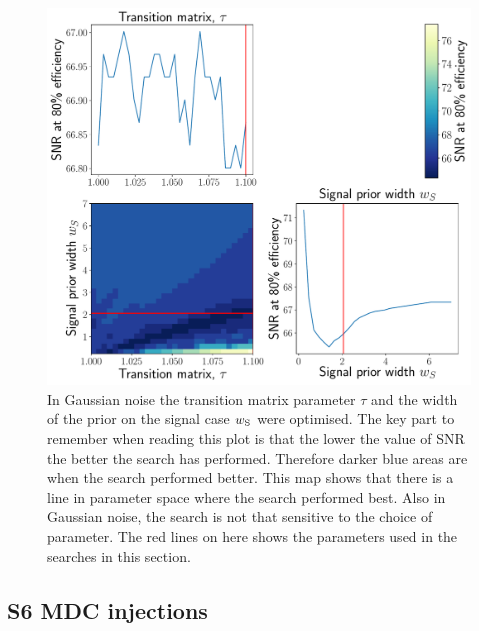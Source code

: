 \begin{figure}[h]
    \centering
    \includegraphics[width=0.9\linewidth]{C3_soap/gauss_optimised.pdf}
    \caption[Optimisation of line aware statistic in Gaussian noise.]{In Gaussian noise the transition matrix parameter $\tau$ and the width of the prior on the signal case $w_{\rm{S}}$ were optimised. The key part to remember when reading this plot is that the lower the value of \gls{SNR} the better the search has performed. Therefore darker blue areas are when the search performed better. This map shows that there is a line in parameter space where the search performed best. Also in Gaussian noise, the search is not that sensitive to the choice of parameter. The red lines on here shows the parameters used in the searches in this section. }
    \label{soap:las:optimisation:gauss}
\end{figure}


\subsection{S6 MDC injections}

